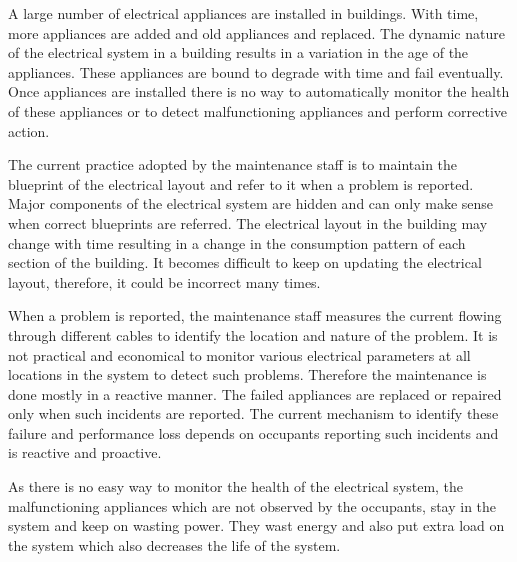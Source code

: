 A large number of electrical appliances are installed in buildings. With time, more appliances are added and old appliances and replaced. The dynamic nature of the electrical system in a building results in a variation in the age of the appliances. These appliances are bound to degrade with time and fail eventually. Once appliances are installed there is no way to automatically monitor the health of these appliances or to detect malfunctioning appliances and perform corrective action.

The current practice adopted by the maintenance staff is to maintain the blueprint of the electrical layout and refer to it when a problem is reported. Major components of the electrical system are hidden and can only make sense when correct blueprints are referred. The electrical layout in the building may change with time resulting in a change in the consumption pattern of each section of the building. It becomes difficult to keep on updating the electrical layout, therefore, it could be incorrect many times.

When a problem is reported, the maintenance staff measures the current flowing through different cables to identify the location and nature of the problem. It is not practical and economical to monitor various electrical parameters at all locations in the system to detect such problems. Therefore the maintenance is done mostly in a reactive manner. The failed appliances are replaced or repaired only when such incidents are reported. The current mechanism to identify these failure and performance loss depends on occupants reporting such incidents and is reactive and proactive.

As there is no easy way to monitor the health of the electrical system, the malfunctioning appliances which are not observed by the occupants, stay in the system and keep on wasting power. They wast energy and also put extra load on the system which also decreases the life of the system.
